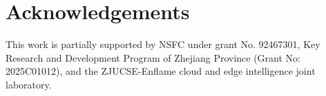 \section*{Acknowledgements}
This work is partially supported by NSFC under grant No. 92467301, Key Research and Development Program of Zhejiang Province (Grant No: 2025C01012), and the ZJUCSE-Enflame cloud and edge intelligence joint laboratory.
